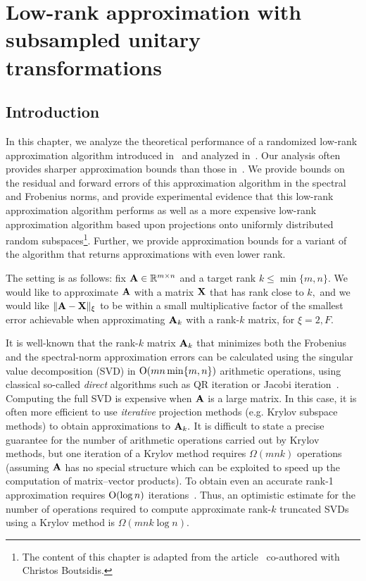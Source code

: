 
\chapter{Low-rank approximation with subsampled unitary transformations}
\label{ch3}

\section{Introduction}
\label{ch3:sec:introduction}

In this chapter, we analyze the theoretical performance of a
randomized low-rank approximation algorithm
introduced in~\cite{WLRT08} and analyzed in~\cite{WLRT08,HMT11,NDT09}. Our
analysis often provides sharper approximation bounds 
than those in~\cite{WLRT08,HMT11,NDT09}. We provide bounds on the residual and
forward errors of this approximation algorithm in the
spectral and Frobenius norms, and provide experimental evidence that this
low-rank approximation algorithm performs as well as a more expensive low-rank 
approximation algorithm based upon projections
onto uniformly distributed random subspaces\footnote{The content of this chapter is adapted from the article~\cite{BG12} co-authored with Christos Boutsidis.}. Further, we provide approximation
bounds for a variant of the algorithm that returns approximations with even lower rank.

The setting is as follows: fix $\mathbf{A} \in \mathbb{R}^{m \times n}$ and a target rank 
$k \leq \min\{m,n\}.$ We would like to approximate $\mathbf{A}$ with a matrix $\mathbf{X}$ 
that has rank close to $k,$ and we would like $\mbox{}\|\mathbf{A} - \mathbf{X}\|_{\xi}$ to be 
within a small multiplicative factor of the smallest error achievable
when approximating $\mathbf{A}_k$ with a rank-$k$ matrix, for $\xi =2,F.$ 

It is well-known that the rank-$k$ matrix $ \mathbf{A}_k$ that minimizes both the Frobenius and 
the spectral-norm approximation errors can be calculated using the singular 
value decomposition (SVD) in $\mathrm{O}( m n \min\{m,n\} )$ arithmetic operations, using classical
so-called \emph{direct} algorithms such as QR iteration or Jacobi 
iteration~\cite{GL96}. Computing the full SVD is expensive
when $\mathbf{A}$ is a large matrix. In this case, it is often more efficient to use
\emph{iterative} projection methods (e.g. Krylov subspace
methods) to obtain approximations to $\mathbf{A}_k.$ It is difficult to state a 
precise guarantee for the number of arithmetic operations carried out by Krylov
methods, but one iteration of a Krylov method requires $\Omega(m n k)$
operations (assuming $\mathbf{A}$ has no special structure which can be exploited
to speed up the computation of matrix--vector products). To obtain even an 
accurate rank-1 approximation 
requires $\mathrm{O}(\log n)$ iterations~\cite{KW92}. Thus, an optimistic
estimate for the number of operations required to compute approximate rank-$k$ 
truncated SVDs using a Krylov method is $\Omega(mn k \log n).$ 

